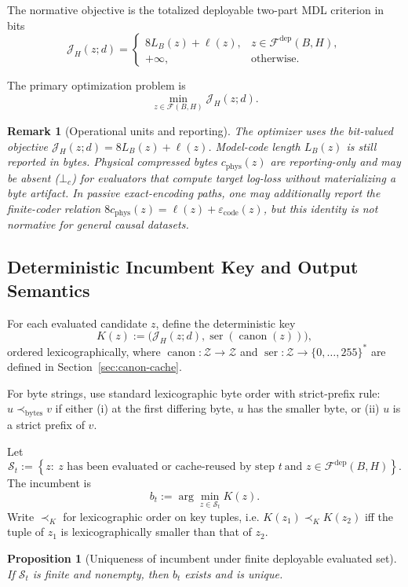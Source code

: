 \documentclass[11pt]{article}
\newtheorem{proposition}{Proposition}
\newtheorem{remark}{Remark}
\begin{document}
The normative objective is the totalized deployable two-part MDL criterion in
bits
\[
\mathcal{J}_H(z;d)=
\begin{cases}
8L_B(z)+\ell(z), & z\in\mathcal{F}^{\mathrm{dep}}(B,H),\\[3pt]
+\infty, & \text{otherwise.}
\end{cases}
\]

The primary optimization problem is
\[
\min_{z\in\mathcal{F}(B,H)}\mathcal{J}_H(z;d).
\]

\begin{remark}[Operational units and reporting]
The optimizer uses the bit-valued objective $\mathcal{J}_H(z;d)=8L_B(z)+\ell(z)$.
Model-code length $L_B(z)$ is still reported in bytes. Physical compressed
bytes $c_{\mathrm{phys}}(z)$ are reporting-only and may be absent
($\bot_c$) for evaluators that compute target log-loss without materializing a
byte artifact. In passive exact-encoding paths, one may additionally report the
finite-coder relation $8c_{\mathrm{phys}}(z)=\ell(z)+\varepsilon_{\mathrm{code}}(z)$,
but this identity is not normative for general causal datasets.
\end{remark}

\subsection{Deterministic Incumbent Key and Output Semantics}

For each evaluated candidate $z$, define the deterministic key
\[
K(z):=\big(\mathcal{J}_H(z;d),\operatorname{ser}(\operatorname{canon}(z))\big),
\]
ordered lexicographically, where $\operatorname{canon}:\mathcal{Z}\to\mathcal{Z}$
and $\operatorname{ser}:\mathcal{Z}\to\{0,\dots,255\}^*$ are defined in
Section~\ref{sec:canon-cache}.

For byte strings, use standard lexicographic byte order with strict-prefix
rule: $u\prec_{\mathrm{bytes}} v$ if either (i) at the first differing byte,
$u$ has the smaller byte, or (ii) $u$ is a strict prefix of $v$.

Let
\[
\mathcal{S}_t:=\left\{z:\ z\text{ has been evaluated or cache-reused by step }t\ \text{and }z\in\mathcal{F}^{\mathrm{dep}}(B,H)\right\}.
\]
The incumbent is
\[
b_t:=\arg\min_{z\in\mathcal{S}_t}K(z).
\]
Write $\prec_K$ for lexicographic order on key tuples, i.e.
$K(z_1)\prec_K K(z_2)$ iff the tuple of $z_1$ is lexicographically smaller than that of $z_2$.

\begin{proposition}[Uniqueness of incumbent under finite deployable evaluated set]
If $\mathcal{S}_t$ is finite and nonempty, then $b_t$ exists and is unique.
\end{proposition}
\end{document}
